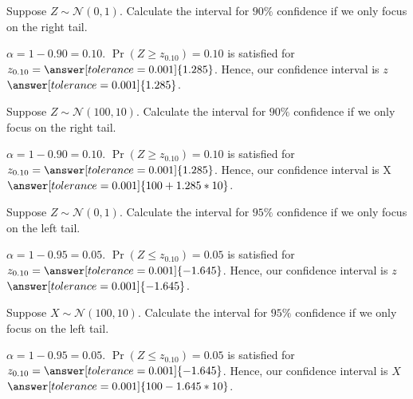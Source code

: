 \documentclass{ximera}
\begin{document}
\begin{problem}
Suppose $Z\sim \mathcal N(0,1)$. Calculate the interval for $90\%$ confidence if we only focus on the right tail. 
\begin{explanation}
$\alpha=1-0.90=0.10$.
$\Pr(Z\geq z_{0.10})=0.10$ is satisfied for $z_{0.10}=\answer[tolerance=0.001]{1.285}$. Hence, our confidence interval is $z$  $\answer[tolerance=0.001]{1.285}$.

\end{explanation}
\end{problem}

\begin{problem}
Suppose $Z\sim \mathcal N(100,10)$. Calculate the interval for $90\%$ confidence if we only focus on the right tail. 
\begin{explanation}
$\alpha=1-0.90=0.10$.
$\Pr(Z\geq z_{0.10})=0.10$ is satisfied for $z_{0.10}=\answer[tolerance=0.001]{1.285}$. Hence, our confidence interval is X  $\answer[tolerance=0.001]{100+1.285*10}$.

\end{explanation}
\end{problem}


\begin{problem}
Suppose $Z\sim \mathcal N(0,1)$. Calculate the interval for $95\%$ confidence if we only focus on the left tail. 
\begin{explanation}
$\alpha=1-0.95=0.05$.
$\Pr(Z\leq z_{0.10})=0.05$ is satisfied for $z_{0.10}=\answer[tolerance=0.001]{-1.645}$. Hence, our confidence interval is $z$  $\answer[tolerance=0.001]{-1.645}$.

\end{explanation}
\end{problem}


\begin{problem}
Suppose $X\sim \mathcal N(100,10)$. Calculate the interval for $95\%$ confidence if we only focus on the left tail. 
\begin{explanation}
$\alpha=1-0.95=0.05$.
$\Pr(Z\leq z_{0.10})=0.05$ is satisfied for $z_{0.10}=\answer[tolerance=0.001]{-1.645}$. Hence, our confidence interval is $X$  $\answer[tolerance=0.001]{100-1.645*10}$.

\end{explanation}
\end{problem}
\end{document}
